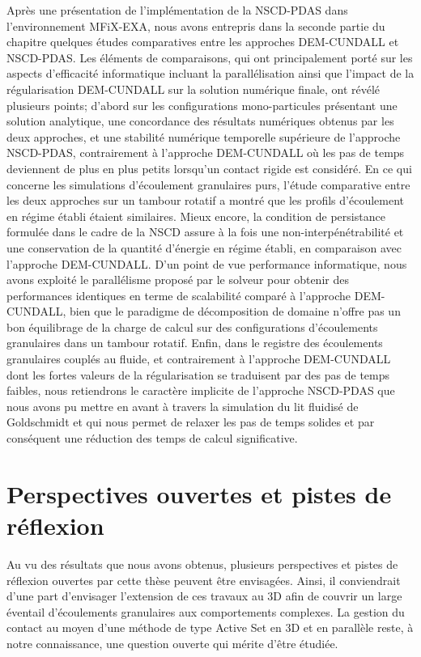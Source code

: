 Après une présentation de l'implémentation de la NSCD-PDAS dans l'environnement MFiX-EXA, nous avons entrepris dans la seconde partie du chapitre quelques études comparatives entre les approches DEM-CUNDALL et NSCD-PDAS. Les éléments de comparaisons, qui ont principalement porté sur les aspects d'efficacité informatique incluant la parallélisation ainsi que l'impact de la régularisation DEM-CUNDALL sur la solution numérique finale, ont révélé plusieurs points; d'abord sur les configurations mono-particules présentant une solution analytique, une concordance des résultats numériques obtenus par les deux approches, et une stabilité numérique temporelle supérieure de l'approche NSCD-PDAS, contrairement à l'approche DEM-CUNDALL où les pas de temps deviennent de plus en plus petits lorsqu'un contact rigide est considéré. En ce qui concerne les simulations d'écoulement granulaires purs, l'étude comparative entre les deux approches sur un tambour rotatif a montré que les profils d'écoulement en régime établi étaient similaires. Mieux encore, la condition de persistance formulée dans le cadre de la NSCD assure à la fois une non-interpénétrabilité et une conservation de la quantité d'énergie en régime établi, en comparaison avec l'approche DEM-CUNDALL. D'un point de vue performance informatique, nous avons exploité le parallélisme proposé par le solveur pour obtenir des performances identiques en terme de scalabilité comparé à l'approche DEM-CUNDALL, bien que le paradigme de décomposition de domaine n'offre pas un bon équilibrage de la charge de calcul sur des configurations d'écoulements granulaires dans un tambour rotatif. Enfin, dans le registre des écoulements granulaires couplés au fluide, et contrairement à l'approche DEM-CUNDALL dont les fortes valeurs de la régularisation se traduisent par des pas de temps faibles, nous retiendrons le caractère implicite de l'approche NSCD-PDAS que nous avons pu mettre en avant à travers la simulation du lit fluidisé de Goldschmidt et qui nous permet de relaxer les pas de temps solides et par conséquent une réduction des temps de calcul significative.

\section{Perspectives ouvertes et pistes de réflexion}

Au vu des résultats que nous avons obtenus, plusieurs perspectives et pistes de réflexion ouvertes par cette thèse peuvent être envisagées. Ainsi, il conviendrait d'une part d'envisager l'extension de ces travaux au 3D afin de couvrir un large éventail d'écoulements granulaires aux comportements complexes. La gestion du contact au moyen d'une méthode de type Active Set en 3D et en parallèle reste, à notre connaissance, une question ouverte qui mérite d'être étudiée.\\

